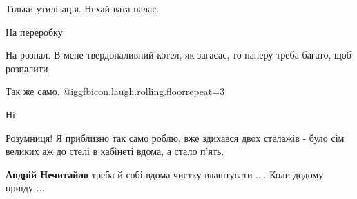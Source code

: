 \begin{itemize}
Тільки утилізація. Нехай вата палає.

 
На переробку

 
На розпал. В мене твердопаливний котел, як загасає, то паперу треба багато, щоб розпалити

 
Так же само. @igg{fbicon.laugh.rolling.floor}{repeat=3} 

 
Ні

 
Розумниця! Я приблизно так само роблю, вже здихався двох стелажів - було сім
великих аж до стелі в кабінеті вдома, а стало п'ять.

\begin{itemize}
 
\textbf{Андрій Нечитайло} треба й собі вдома чистку влаштувати .... Коли додому приїду ...
\end{itemize}



\end{itemize}
